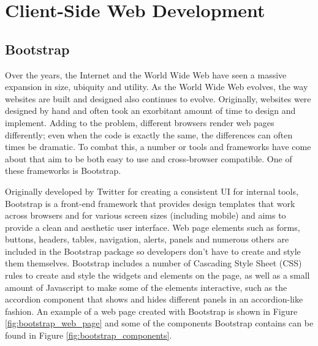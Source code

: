 \section{Client-Side Web Development}

\subsection{Bootstrap}

Over the years, the Internet and the World Wide Web have seen a massive expansion in size, ubiquity and utility. As the World Wide Web evolves, the way websites are built and designed also continues to evolve. Originally, websites were designed by hand and often took an exorbitant amount of time to design and implement. Adding to the problem, different browsers render web pages differently; even when the code is exactly the same, the differences can often times be dramatic. To combat this, a number or tools and frameworks have come about that aim to be both easy to use and cross-browser compatible\cite{lerner2012forge}. One of these frameworks is Bootstrap. 

Originally developed by Twitter for creating a consistent UI for internal tools, Bootstrap is a front-end framework that provides design templates that work across browsers and for various screen sizes (including mobile) and aims to provide a clean and aesthetic user interface. Web page elements such as forms, buttons, headers, tables, navigation, alerts, panels and numerous others are included in the Bootstrap package so developers don't have to create and style them themselves. Bootstrap includes a number of Cascading Style Sheet (CSS) rules to create and style the widgets and elements on the page, as well as a small amount of Javascript to make some of the elements interactive, such as the accordion component that shows and hides different panels in an accordion-like fashion. An example of a web page created with Bootstrap is shown in Figure \ref{fig:bootstrap_web_page} and some of the components Bootstrap contains can be found in Figure \ref{fig:bootstrap_components}\cite{bootstrap2014}.

